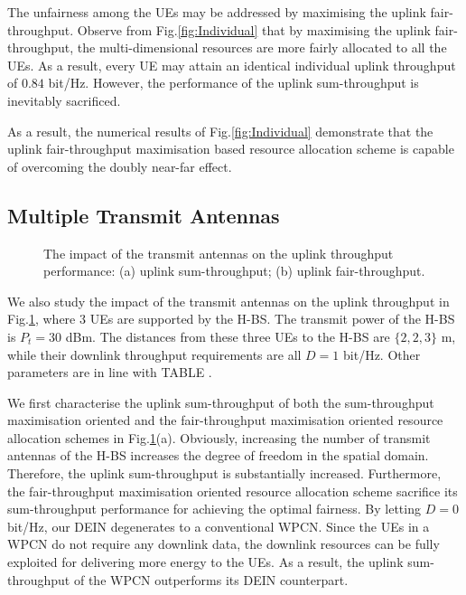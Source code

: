\documentclass[12pt,draft,onecolumn,journal]{IEEEtran}
\begin{document}
The unfairness among the UEs may be addressed by maximising the uplink fair-throughput. Observe from Fig.\ref{fig:Individual} that by maximising the uplink fair-throughput, the multi-dimensional resources are more fairly allocated to all the UEs. As a result, every UE may attain an identical individual uplink throughput of $0.84$ bit/Hz. However, the performance of the uplink sum-throughput is inevitably sacrificed.

As a result, the numerical results of Fig.\ref{fig:Individual} demonstrate that the uplink fair-throughput maximisation based resource allocation scheme is capable of overcoming the doubly near-far effect.

\subsection{Multiple Transmit Antennas}

\begin{figure}[!t]
\setlength{\abovecaptionskip}{0pt}
\setlength{\belowcaptionskip}{0pt}\caption{The impact of the transmit antennas on the uplink throughput performance: (a) uplink sum-throughput; (b) uplink fair-throughput.}
\label{fig:Antenna}
\end{figure}

We also study the impact of the transmit antennas on the uplink throughput in Fig.\ref{fig:Antenna}, where 3 UEs are supported by the H-BS. The transmit power of the H-BS is $P_t = 30$ dBm. The distances from these three UEs to the H-BS are $\{2,2,3\}$ m, while their downlink throughput requirements are all $D=1$ bit/Hz. Other parameters are in line with TABLE \uppercase\expandafter{}.

We first characterise the uplink sum-throughput of both the sum-throughput maximisation oriented and the fair-throughput maximisation oriented resource allocation schemes in Fig.\ref{fig:Antenna}(a). Obviously, increasing the number of transmit antennas of the H-BS increases the degree of freedom in the spatial domain. Therefore, the uplink sum-throughput is substantially increased. Furthermore, the fair-throughput maximisation oriented resource allocation scheme sacrifice its sum-throughput performance for achieving the optimal fairness. By letting $D=0$ bit/Hz, our DEIN degenerates to a conventional WPCN. Since the UEs in a WPCN do not require any downlink data, the downlink resources can be fully exploited for delivering more energy to the UEs. As a result, the uplink sum-throughput of the WPCN outperforms its DEIN counterpart.
\end{document}
